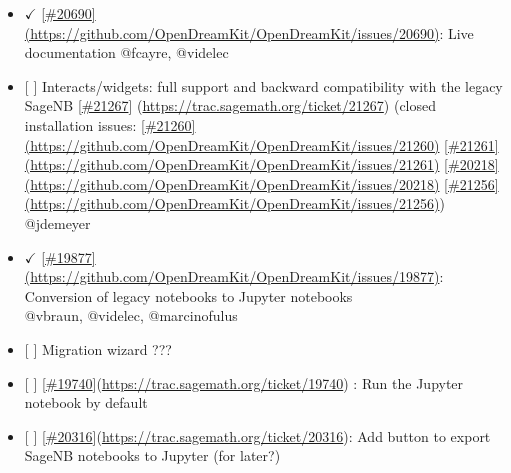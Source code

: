 \begin{itemize}
\tightlist
\item
  \(\checkmark\)
  \href{http://trac.sagemath.org/ticket/20690}{{[}\#20690{]}(https://github.com/OpenDreamKit/OpenDreamKit/issues/20690)}:
  Live documentation @fcayre, @videlec
\item
  {[} {]} Interacts/widgets: full support and backward compatibility
  with the legacy SageNB
  {[}\href{https://github.com/OpenDreamKit/OpenDreamKit/issues/21267}{\#21267}{]}
  (\url{https://trac.sagemath.org/ticket/21267}) (closed installation
  issues:
  \href{https://trac.sagemath.org/ticket/21260}{{[}\#21260{]}(https://github.com/OpenDreamKit/OpenDreamKit/issues/21260)}
  \href{https://trac.sagemath.org/ticket/21261}{{[}\#21261{]}(https://github.com/OpenDreamKit/OpenDreamKit/issues/21261)}
  \href{https://trac.sagemath.org/ticket/20218}{{[}\#20218{]}(https://github.com/OpenDreamKit/OpenDreamKit/issues/20218)}
  \href{https://trac.sagemath.org/ticket/21256}{{[}\#21256{]}(https://github.com/OpenDreamKit/OpenDreamKit/issues/21256)})
  @jdemeyer
\item
  \(\checkmark\)
  \href{https://trac.sagemath.org/ticket/19877}{{[}\#19877{]}(https://github.com/OpenDreamKit/OpenDreamKit/issues/19877)}:
  Conversion of legacy notebooks to Jupyter notebooks\\
  @vbraun, @videlec, @marcinofulus
\item
  {[} {]} Migration wizard ???
\item
  {[} {]}
  {[}\href{https://github.com/OpenDreamKit/OpenDreamKit/issues/19740}{\#19740}{]}(\url{https://trac.sagemath.org/ticket/19740})
  : Run the Jupyter notebook by default
\item
  {[} {]}
  {[}\href{https://github.com/OpenDreamKit/OpenDreamKit/issues/20316}{\#20316}{]}(\url{https://trac.sagemath.org/ticket/20316}):
  Add button to export SageNB notebooks to Jupyter (for later?)
\end{itemize}
